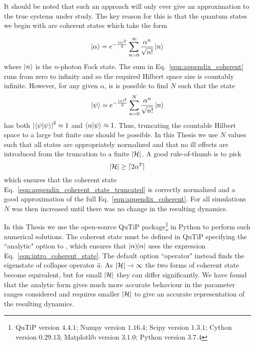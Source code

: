 It should be noted that such an approach will only ever give an approximation to the true systems under study. The key reason for this is that the quantum states we begin with are coherent states which take the form

\begin{equation}\label{eqn:appendix_coherent}
\ket{\alpha} = e^{-\frac{\left|\alpha\right|^2}{2}}\sum_{n=0}^\infty \frac{\alpha^n}{\sqrt{n!}}\ket{n}
\end{equation}
where $\ket{n}$ is the $n$-photon Fock state. The sum in Eq.~\ref{eqn:appendix_coherent} runs from zero to infinity and so the required Hilbert space size is countably infinite. However, for any given $\alpha$, is is possible to find $N$ such that the state
\begin{equation}\label{eqn:appendix_coherent_state_truncated}
\ket{\psi} = e^{-\frac{\left|\alpha\right|^2}{2}}\sum_{n=0}^N \frac{\alpha^n}{\sqrt{n!}}\ket{n}
\end{equation} 
has both $\left|\bra{\psi}\ket{\psi}\right|^2 \approx 1$ and $\bra{\alpha}\ket{\psi} \approx 1$. Thus, truncating the countable Hilbert space to a large but finite one should be possible. In this Thesis we use $N$ values such that all states are appropriately normalized and that no ill effects are introduced from the truncation to a finite $\left|\mathcal{H}\right|$. A good rule-of-thumb is to pick
\begin{equation}\label{eqn:rule_of_thumb}
\left|\mathcal{H}\right| \ge \lceil 2 \alpha^2 \rceil
\end{equation}
which ensures that the coherent state Eq.~\ref{eqn:appendix_coherent_state_truncated} is correctly normalized and a good approximation of the full Eq.~\ref{eqn:appendix_coherent}. For all simulations $N$ was then increased until there was no change in the resulting dynamics.

In this Thesis we use the open-source QuTiP package\footnote{QuTiP version $4.4.1$; Numpy version $1.16.4$; Scipy version $1.3.1$; Cython version $0.29.13$; Matplotlib version $3.1.0$; Python version $3.7.4$} \cite{qutip2} in Python to perform such numerical solutions. The coherent state must be defined in QuTiP specifying the ``analytic" option to , which ensures that $\dyad{\alpha}$ uses the expression Eq.~\ref{eqn:intro_coherent_state}. The default option ``operator" instead finds the eigenstate of collapse operator $\hat{a}$. As $\left|\mathcal{H}\right| \rightarrow \infty$ the two forms of coherent state become equivalent, but for small $\left|\mathcal{H}\right|$ they can differ significantly. We have found that the analytic form gives much more accurate behaviour in the parameter ranges considered and requires smaller $\left|\mathcal{H}\right|$ to give an accurate representation of the resulting dynamics.

